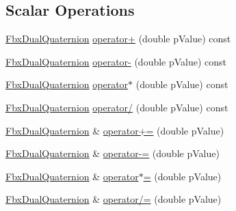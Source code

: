 \subsection*{Scalar Operations}
\begin{DoxyCompactItemize}
\item 
\hyperlink{class_fbx_dual_quaternion}{Fbx\+Dual\+Quaternion} \hyperlink{class_fbx_dual_quaternion_a0c49437e36f15a2c405e3f055ca615c4}{operator+} (double p\+Value) const
\item 
\hyperlink{class_fbx_dual_quaternion}{Fbx\+Dual\+Quaternion} \hyperlink{class_fbx_dual_quaternion_a9900013ba99f3503e574e05516b47082}{operator-\/} (double p\+Value) const
\item 
\hyperlink{class_fbx_dual_quaternion}{Fbx\+Dual\+Quaternion} \hyperlink{class_fbx_dual_quaternion_a70a637a6d19bfb510836a56799a96993}{operator$\ast$} (double p\+Value) const
\item 
\hyperlink{class_fbx_dual_quaternion}{Fbx\+Dual\+Quaternion} \hyperlink{class_fbx_dual_quaternion_a4b1a647cdefe5a4005525230545be830}{operator/} (double p\+Value) const
\item 
\hyperlink{class_fbx_dual_quaternion}{Fbx\+Dual\+Quaternion} \& \hyperlink{class_fbx_dual_quaternion_a0b701dcff5e3982a9728241932dff65a}{operator+=} (double p\+Value)
\item 
\hyperlink{class_fbx_dual_quaternion}{Fbx\+Dual\+Quaternion} \& \hyperlink{class_fbx_dual_quaternion_a7f4a57f4e63ea5eaa809e5af5e083828}{operator-\/=} (double p\+Value)
\item 
\hyperlink{class_fbx_dual_quaternion}{Fbx\+Dual\+Quaternion} \& \hyperlink{class_fbx_dual_quaternion_af1410bc58c2d270f37a75f12e9aaedb1}{operator$\ast$=} (double p\+Value)
\item 
\hyperlink{class_fbx_dual_quaternion}{Fbx\+Dual\+Quaternion} \& \hyperlink{class_fbx_dual_quaternion_acfcd7a62201e9b0f41bf5f1a6bd0d42c}{operator/=} (double p\+Value)
\end{DoxyCompactItemize}
